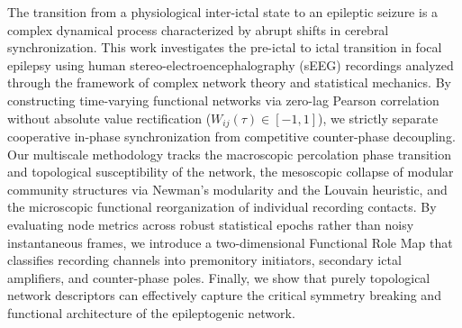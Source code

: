 
The transition from a physiological inter-ictal state to an epileptic seizure is a complex dynamical process characterized by abrupt shifts in cerebral synchronization. This work investigates the pre-ictal to ictal transition in focal epilepsy using human stereo-electroencephalography (sEEG) recordings analyzed through the framework of complex network theory and statistical mechanics. By constructing time-varying functional networks via zero-lag Pearson correlation without absolute value rectification ($W_{ij}(\tau) \in [-1, 1]$), we strictly separate cooperative in-phase synchronization from competitive counter-phase decoupling. Our multiscale methodology tracks the macroscopic percolation phase transition and topological susceptibility of the network, the mesoscopic collapse of modular community structures via Newman's modularity and the Louvain heuristic, and the microscopic functional reorganization of individual recording contacts. By evaluating node metrics across robust statistical epochs rather than noisy instantaneous frames, we introduce a two-dimensional Functional Role Map that classifies recording channels into premonitory initiators, secondary ictal amplifiers, and counter-phase poles. Finally, we show that purely topological network descriptors can effectively capture the critical symmetry breaking and functional architecture of the epileptogenic network.
